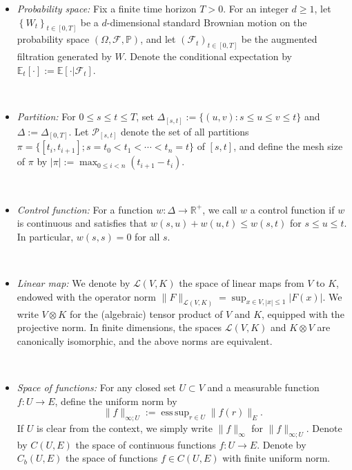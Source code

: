 \documentclass[11pt,reqno]{amsart}
\DeclareMathOperator*{\esssup}{ess\,sup}
\numberwithin{equation}{section}
\def\R{\mathbb R}
\def\E{\mathbb E}
\begin{document}
\begin{itemize}[leftmargin=1.2em, labelsep=0.2em]  
 


\item {\it Probability space:} Fix a finite time horizon $T>0$. For an integer $d\ge 1$, let $\left\{W_t\right\}_{t\in[0,T]}$ be a $d$-dimensional standard Brownian motion on the probability space $(\Omega,\mathcal F,\mathbb P)$, and let $(\mathcal F_{t})_{t\in[0,T]}$ be the augmented filtration generated by $W$. Denote the conditional expectation by $\E_{t}[\bm\cdot] := \E[\bm\cdot |\mathcal F_{t}]$. 

\



\item {\it Partition:} For $0\le s\le t\le T$, set $\Delta_{[s,t]}:=\{(u, v): s \leq u \leq v \leq t\}$ and $\Delta := \Delta_{[0,T]}$. Let $\mathcal P_{[s,t]}$ denote the set of all partitions $\pi=\{[t_i,t_{i+1}];s=t_0< t_1<\cdots< t_n=t\}$ of $[s,t]$, and define the mesh size of $\pi$ by $|\pi| :=\max_{0\le i<n}(t_{i+1}-t_i)$. 


\


\item {\it Control function:} For a function $w:\Delta \to \R^{+}$, we call $w$ a control function if $w$ is continuous and satisfies that $w(s,u) + w(u,t) \le w(s,t)$ for $s\le u \le t$. In particular, $w(s,s) = 0$ for all $s$.

\ 

\item {\it Linear map:} We denote by $\mathscr L(V,K)$ the space of linear maps from $V$ to $K$, endowed with the operator norm $\|F\|_{\mathscr L(V,K)}=\sup _{x \in V,|x| \leq 1}|F(x)|$. We write $V\otimes K$ for the (algebraic) tensor product of $V$ and $K$,
equipped with the projective norm.
In finite dimensions, the spaces $\mathscr L(V,K)$ and $K \otimes V$
are canonically isomorphic, and the above norms are equivalent.

\ 

\item {\it Space of functions:} 
For any closed set $U\subset V$ and a measurable function $f:U\to E$, define the uniform norm by
\begin{equation*}
\|f\|_{\infty;U} := \esssup_{r\in U}\|f(r)\|_{E}.
\end{equation*}
If $U$ is clear from the context, we simply write $\|f\|_{\infty}$ for $ \|f\|_{\infty;U}$.
Denote by $C(U,E)$ the space of continuous functions $f:U\to E$. Denote by $C_{b}(U,E)$ the space of functions $f\in C(U,E)$ with finite uniform norm. 


\end{itemize}
\end{document}
